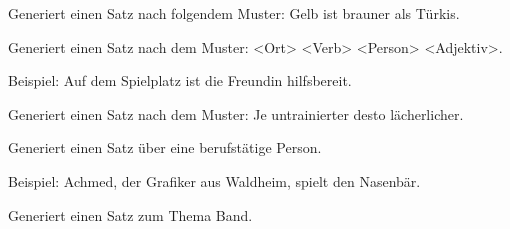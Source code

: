 \documentclass[a4paper,12pt,oneside]{sphinxmanual}
\begin{document}
\begin{fulllineitems}
\label{module:pyzufall.satz.satz_absurde_farbfunktion}
Generiert einen Satz nach folgendem Muster: Gelb ist brauner als Türkis.

\end{fulllineitems}


\begin{fulllineitems}
\label{module:pyzufall.satz.satz_adjektiv_am_ort}
Generiert einen Satz nach dem Muster: \textless{}Ort\textgreater{} \textless{}Verb\textgreater{} \textless{}Person\textgreater{} \textless{}Adjektiv\textgreater{}.

Beispiel: Auf dem Spielplatz ist die Freundin hilfsbereit.

\end{fulllineitems}


\begin{fulllineitems}
\label{module:pyzufall.satz.satz_adjektiv_sprichwort}
Generiert einen Satz nach dem Muster: Je untrainierter desto lächerlicher.

\end{fulllineitems}


\begin{fulllineitems}
\label{module:pyzufall.satz.satz_arbeit}
Generiert einen Satz über eine berufstätige Person.

Beispiel: Achmed, der Grafiker aus Waldheim, spielt den Nasenbär.

\end{fulllineitems}


\begin{fulllineitems}
\label{module:pyzufall.satz.satz_band}
Generiert einen Satz zum Thema Band.

\end{fulllineitems}
\end{document}
